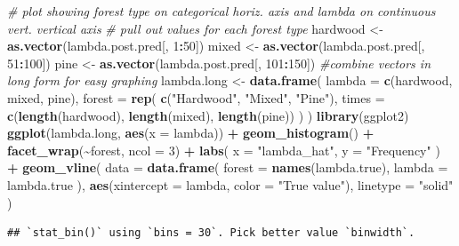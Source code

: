 \documentclass[
]{article}
\newenvironment{Shaded}{\begin{snugshade}}{\end{snugshade}}
\newcommand{\AttributeTok}[1]{\textcolor[rgb]{0.13,0.29,0.53}{#1}}
\newcommand{\CommentTok}[1]{\textcolor[rgb]{0.56,0.35,0.01}{\textit{#1}}}
\newcommand{\DecValTok}[1]{\textcolor[rgb]{0.00,0.00,0.81}{#1}}
\newcommand{\FunctionTok}[1]{\textcolor[rgb]{0.13,0.29,0.53}{\textbf{#1}}}
\newcommand{\NormalTok}[1]{#1}
\newcommand{\OtherTok}[1]{\textcolor[rgb]{0.56,0.35,0.01}{#1}}
\newcommand{\SpecialCharTok}[1]{\textcolor[rgb]{0.81,0.36,0.00}{\textbf{#1}}}
\newcommand{\StringTok}[1]{\textcolor[rgb]{0.31,0.60,0.02}{#1}}
\begin{document}
\begin{Shaded}
\begin{Highlighting}[]
\CommentTok{\# plot showing forest type on categorical horiz. axis and lambda on continuous vert. vertical axis}
\CommentTok{\# pull out values for each forest type}
\NormalTok{hardwood }\OtherTok{\textless{}{-}} \FunctionTok{as.vector}\NormalTok{(lambda.post.pred[, }\DecValTok{1}\SpecialCharTok{:}\DecValTok{50}\NormalTok{])}
\NormalTok{mixed    }\OtherTok{\textless{}{-}} \FunctionTok{as.vector}\NormalTok{(lambda.post.pred[, }\DecValTok{51}\SpecialCharTok{:}\DecValTok{100}\NormalTok{])}
\NormalTok{pine     }\OtherTok{\textless{}{-}} \FunctionTok{as.vector}\NormalTok{(lambda.post.pred[, }\DecValTok{101}\SpecialCharTok{:}\DecValTok{150}\NormalTok{])}
\CommentTok{\#combine vectors in long form for easy graphing}
\NormalTok{lambda.long }\OtherTok{\textless{}{-}} \FunctionTok{data.frame}\NormalTok{(}
  \AttributeTok{lambda =} \FunctionTok{c}\NormalTok{(hardwood, mixed, pine),}
  \AttributeTok{forest =} \FunctionTok{rep}\NormalTok{(}
    \FunctionTok{c}\NormalTok{(}\StringTok{"Hardwood"}\NormalTok{, }\StringTok{"Mixed"}\NormalTok{, }\StringTok{"Pine"}\NormalTok{),}
    \AttributeTok{times =} \FunctionTok{c}\NormalTok{(}\FunctionTok{length}\NormalTok{(hardwood), }\FunctionTok{length}\NormalTok{(mixed), }\FunctionTok{length}\NormalTok{(pine))}
\NormalTok{  )}
\NormalTok{)}
\FunctionTok{library}\NormalTok{(ggplot2)}
\FunctionTok{ggplot}\NormalTok{(lambda.long, }\FunctionTok{aes}\NormalTok{(}\AttributeTok{x =}\NormalTok{ lambda)) }\SpecialCharTok{+}
  \FunctionTok{geom\_histogram}\NormalTok{() }\SpecialCharTok{+}
  \FunctionTok{facet\_wrap}\NormalTok{(}\SpecialCharTok{\textasciitilde{}}\NormalTok{forest, }\AttributeTok{ncol =} \DecValTok{3}\NormalTok{) }\SpecialCharTok{+}
  \FunctionTok{labs}\NormalTok{(}
    \AttributeTok{x =} \StringTok{"lambda\_hat"}\NormalTok{,}
    \AttributeTok{y =} \StringTok{"Frequency"}
\NormalTok{  ) }\SpecialCharTok{+} 
  \FunctionTok{geom\_vline}\NormalTok{(}
    \AttributeTok{data =} \FunctionTok{data.frame}\NormalTok{(}
      \AttributeTok{forest =} \FunctionTok{names}\NormalTok{(lambda.true),}
      \AttributeTok{lambda =}\NormalTok{ lambda.true}
\NormalTok{    ),}
    \FunctionTok{aes}\NormalTok{(}\AttributeTok{xintercept =}\NormalTok{ lambda, }\AttributeTok{color =} \StringTok{"True value"}\NormalTok{),}
    \AttributeTok{linetype =} \StringTok{"solid"}
\NormalTok{)}
\end{Highlighting}
\end{Shaded}

\begin{verbatim}
## `stat_bin()` using `bins = 30`. Pick better value `binwidth`.
\end{verbatim}
\end{document}
